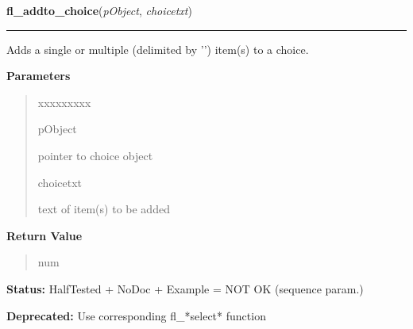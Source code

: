 \hspace{.8\funcindent}\begin{boxedminipage}{\funcwidth}

    \raggedright \textbf{fl\_addto\_choice}(\textit{pObject}, \textit{choicetxt})

    \vspace{-1.5ex}

    \rule{\textwidth}{0.5\fboxrule}
\setlength{\parskip}{2ex}
    Adds a single or multiple (delimited by '{\textbar}') item(s) to a 
    choice.

\setlength{\parskip}{1ex}
      \textbf{Parameters}
      \vspace{-1ex}

      \begin{quote}
        \begin{Ventry}{xxxxxxxxx}

          \item[pObject]

          pointer to choice object

          \item[choicetxt]

          text of item(s) to be added

        \end{Ventry}

      \end{quote}

      \textbf{Return Value}
    \vspace{-1ex}

      \begin{quote}
      num

      \end{quote}

\textbf{Status:} HalfTested + NoDoc + Example = NOT OK (sequence param.)



\textbf{Deprecated:} Use corresponding fl\_*select* function



    \end{boxedminipage}

    \label{xformslib:deprecated:fl_replace_choice}

    \vspace{0.5ex}

